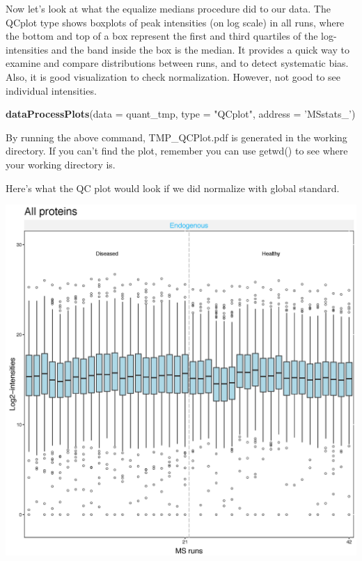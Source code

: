 \documentclass[]{book}
\newenvironment{Shaded}{\begin{snugshade}}{\end{snugshade}}
\newcommand{\DataTypeTok}[1]{\textcolor[rgb]{0.13,0.29,0.53}{#1}}
\newcommand{\KeywordTok}[1]{\textcolor[rgb]{0.13,0.29,0.53}{\textbf{#1}}}
\newcommand{\NormalTok}[1]{#1}
\newcommand{\StringTok}[1]{\textcolor[rgb]{0.31,0.60,0.02}{#1}}
\begin{document}
Now let's look at what the equalize medians procedure did to our data.
The QCplot type shows boxplots of peak intensities (on log scale) in all runs, where the bottom and top of a box represent the first and third quartiles of the log-intensities and the band inside the box is the median. It provides a quick way to examine and compare distributions between runs, and to detect systematic bias. Also, it is good visualization to check normalization. However, not good to see individual intensities.

\begin{Shaded}
\begin{Highlighting}[]
\KeywordTok{dataProcessPlots}\NormalTok{(}\DataTypeTok{data =}\NormalTok{ quant_tmp, }\DataTypeTok{type =} \StringTok{"QCplot"}\NormalTok{, }\DataTypeTok{address =} \StringTok{'MSstats_'}\NormalTok{)}
\end{Highlighting}
\end{Shaded}

By running the above command, TMP\_QCPlot.pdf is generated in the working directory. If you can't find the plot, remember you can use getwd() to see where your working directory is.

Here's what the QC plot would look if we did normalize with global standard.

\includegraphics{img/MSstats_QCPlot_all_global.png}
\end{document}
